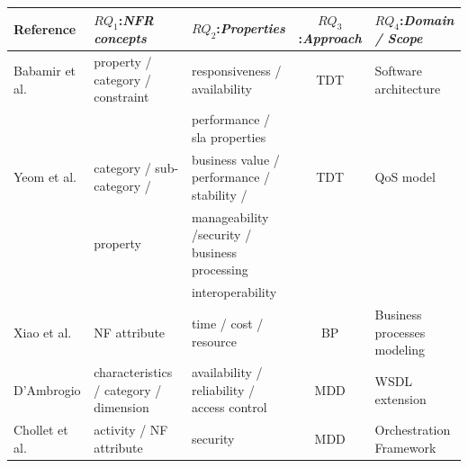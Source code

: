 \documentclass{sig-alternate}
\begin{document}
  
\begin{table}[ht!]
\centering
\tiny
\begin{tabular}{l|l|l|c|l}
  \hline 
  \hline
   \textbf{Reference} & \textbf{$RQ_1$:\textit{NFR concepts}} &
   \textbf{$RQ_2$:\textit{Properties}} & \textbf{$RQ_3$:\textit{Approach}} &
   \textbf{$RQ_4$:\textit{Domain / Scope}} 
   \\
  \hline
  \hline  
  Babamir et al. \cite{Babamir2010} &  property / category / constraint & responsiveness /
  availability   & TDT & Software architecture
 \\  
  &  & performance / sla properties   &  & 
 \\ 
  \hline   
 
  Yeom et al. \cite{Yeom2006} & category / sub-category / & business value / performance / stability /
   & TDT & QoS model\\ 
   & property & manageability /security / business processing  & & \\
    &  & interoperability & & \\ 
  \hline 
  
  Xiao et al. \cite{XiaoCZBOLH08} &  NF attribute  & time /
cost / resource  & BP  & Business processes modeling
   \\   
  \hline 
  D'Ambrogio \cite{DAmbrogio06} &  characteristics / category / dimension & availability /
  reliability / access control & MDD & WSDL extension
 \\
   \hline
  Chollet et al. \cite{CholletL09} & activity / NF attribute & security  & MDD 
  & Orchestration Framework
   \\


\end{tabular}
\end{table}
\end{document}
